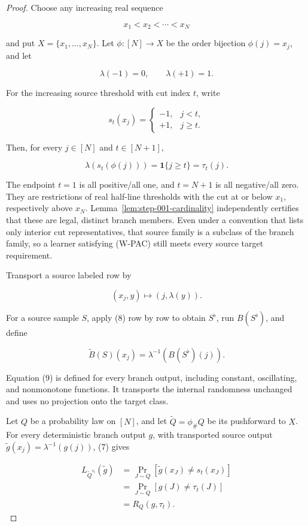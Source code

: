 \begin{proof}
Choose any increasing real sequence

\[
x_1<x_2<\cdots<x_N
\]

and put \(X=\{x_1,\ldots,x_N\}\). Let \(\phi:[N]\to X\) be the order bijection \(\phi(j)=x_j\), and let

\[
\lambda(-1)=0,\qquad \lambda(+1)=1.
\]

For the increasing source threshold with cut index \(t\), write

\[
s_t(x_j)=
\begin{cases}
-1,&j<t,\\
+1,&j\ge t.
\end{cases}
\]

Then, for every \(j\in[N]\) and \(t\in[N+1]\),

\[
\lambda(s_t(\phi(j)))=\mathbf1\{j\ge t\}=\tau_t(j).
\tag{7}
\]

The endpoint \(t=1\) is all positive/all one, and \(t=N+1\) is all negative/all zero. They are restrictions of real half-line thresholds with the cut at or below \(x_1\), respectively above \(x_N\). Lemma~\ref{lem:step-001-cardinality} independently certifies that these are legal, distinct branch members. Even under a convention that lists only interior cut representatives, that source family is a subclass of the branch family, so a learner satisfying (W-PAC) still meets every source target requirement.

Transport a source labeled row by

\[
(x_j,y)\longmapsto(j,\lambda(y)).
\tag{8}
\]

For a source sample \(S\), apply (8) row by row to obtain \(S^{\flat}\), run \(B(S^{\flat})\), and define

\[
\widetilde B(S)(x_j)
=\lambda^{-1}\!\left(B(S^{\flat})(j)\right).
\tag{9}
\]

Equation (9) is defined for every branch output, including constant, oscillating, and nonmonotone functions. It transports the internal randomness unchanged and uses no projection onto the target class.

Let \(Q\) be a probability law on \([N]\), and let \(\widetilde Q=\phi_{\#}Q\) be its pushforward to \(X\). For every deterministic branch output \(g\), with transported source output \(\widetilde g(x_j)=\lambda^{-1}(g(j))\), (7) gives

\[
\begin{aligned}
L_{\widetilde Q^{s_t}}(\widetilde g)
&=\Pr_{J\sim Q}
   [\widetilde g(x_J)\ne s_t(x_J)]\\
&=\Pr_{J\sim Q}[g(J)\ne\tau_t(J)]\\
&=R_Q(g,\tau_t).
\end{aligned}
\tag{10}
\]


\end{proof}
